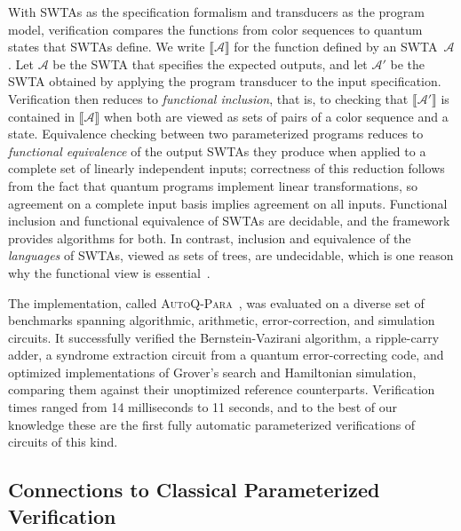 With SWTAs as the specification formalism and transducers as the program model,
verification compares the functions from color sequences to quantum states
that SWTAs define. We write $\llbracket \mathcal{A} \rrbracket$ for the
function defined by an SWTA~$\mathcal{A}$. Let $\mathcal{A}$ be the SWTA that
specifies the expected outputs, and let $\mathcal{A}'$ be the SWTA obtained by
applying the program transducer to the input specification. Verification then
reduces to \emph{functional inclusion}, that is, to checking that
$\llbracket \mathcal{A}' \rrbracket$ is contained in $\llbracket \mathcal{A}
\rrbracket$ when both are viewed as sets of pairs of a color sequence and a
state. Equivalence checking between two parameterized programs reduces to
\emph{functional equivalence} of the output SWTAs they produce when applied to
a complete set of linearly independent inputs; correctness of this reduction
follows from the fact that quantum programs implement linear transformations,
so agreement on a complete input basis implies agreement on all inputs.
Functional inclusion and functional equivalence of SWTAs are decidable, and
the framework provides algorithms for both. In contrast, inclusion and
equivalence of the \emph{languages} of SWTAs, viewed as sets of trees, are
undecidable, which is one reason why the functional view is
essential~\cite{AutoQPara}.

The implementation, called \textsc{AutoQ-Para}~\cite{AutoQPara}, was evaluated
on a diverse set of benchmarks spanning algorithmic, arithmetic,
error-correction, and simulation circuits. It successfully verified the
Bernstein-Vazirani algorithm, a ripple-carry adder, a syndrome extraction
circuit from a quantum error-correcting code, and optimized implementations
of Grover's search and Hamiltonian simulation, comparing them against their
unoptimized reference counterparts. Verification times ranged from
14 milliseconds to 11 seconds, and to the best of our knowledge
these are the first fully automatic parameterized verifications of circuits
of this kind.

\subsection{Connections to Classical Parameterized Verification}


